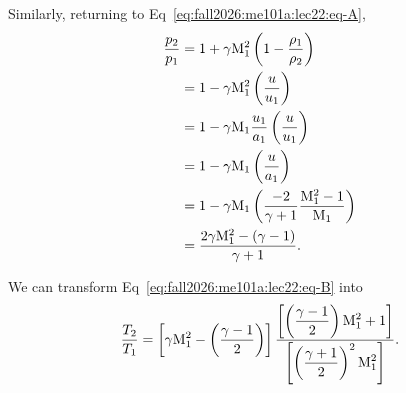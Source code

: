 \begin{node}
Similarly, returning to Eq~\eqref{eq:fall2026:me101a:lec22:eq-A},
\begin{subequations}
  \begin{align}
\frac{p_{2}}{p_{1}} &= 1+\gamma\mathrm{M}_{1}^{2}\left(1-\frac{\rho_{1}}{\rho_{2}}\right)\\
&=1-\gamma\mathrm{M}_{1}^{2}\left(\frac{u}{u_{1}}\right)\\
&=1-\gamma\mathrm{M}_{1}\frac{u_{1}}{a_{1}}\left(\frac{u}{u_{1}}\right)\\
&=1-\gamma\mathrm{M}_{1}\left(\frac{u}{a_{1}}\right)\\
&=1-\gamma\mathrm{M}_{1}\left(\frac{-2}{\gamma+1}\frac{\mathrm{M}_{1}^{2}-1}{\mathrm{M}_{1}}\right)\\
&=\frac{2\gamma\mathrm{M}_{1}^{2}-(\gamma-1)}{\gamma+1}.
  \end{align}
\end{subequations}
\end{node}

\begin{node}
We can transform Eq~\eqref{eq:fall2026:me101a:lec22:eq-B} into
\begin{equation}\label{eq:fall2026:me101a:lec22:eq-2}
\frac{T_{2}}{T_{1}}=\left[\gamma\mathrm{M}_{1}^{2}-\left(\frac{\gamma-1}{2}\right)\right]\frac{\displaystyle{\left[\left(\frac{\gamma-1}{2}\right)\mathrm{M}_{1}^{2}+1\right]}}{\displaystyle{\left[\left(\frac{\gamma+1}{2}\right)^{2}\mathrm{M}_{1}^{2}\right]}}.
\end{equation}
\end{node}

